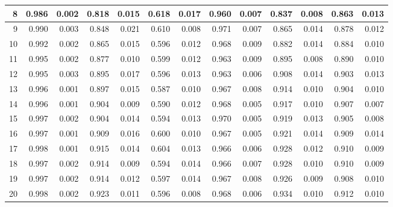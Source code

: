 \documentclass[
]{article}
\begin{document}
\begin{table}[H]
{\begin{tabular}[t]{r|r|r|r|r|r|r|r|r|r|r|r|r}
\hline
\hspace{1em}8 & 0.986 & 0.002 & 0.818 & 0.015 & 0.618 & 0.017 & 0.960 & 0.007 & 0.837 & 0.008 & 0.863 & 0.013\\
\hline
\hspace{1em}9 & 0.990 & 0.003 & 0.848 & 0.021 & 0.610 & 0.008 & 0.971 & 0.007 & 0.865 & 0.014 & 0.878 & 0.012\\
\hline
\hspace{1em}10 & 0.992 & 0.002 & 0.865 & 0.015 & 0.596 & 0.012 & 0.968 & 0.009 & 0.882 & 0.014 & 0.884 & 0.010\\
\hline
\hspace{1em}11 & 0.995 & 0.002 & 0.877 & 0.010 & 0.599 & 0.012 & 0.963 & 0.009 & 0.895 & 0.008 & 0.890 & 0.010\\
\hline
\hspace{1em}12 & 0.995 & 0.003 & 0.895 & 0.017 & 0.596 & 0.013 & 0.963 & 0.006 & 0.908 & 0.014 & 0.903 & 0.013\\
\hline
\hspace{1em}13 & 0.996 & 0.001 & 0.897 & 0.015 & 0.587 & 0.010 & 0.967 & 0.008 & 0.914 & 0.010 & 0.904 & 0.010\\
\hline
\hspace{1em}14 & 0.996 & 0.001 & 0.904 & 0.009 & 0.590 & 0.012 & 0.968 & 0.005 & 0.917 & 0.010 & 0.907 & 0.007\\
\hline
\hspace{1em}15 & 0.997 & 0.002 & 0.904 & 0.014 & 0.594 & 0.013 & 0.970 & 0.005 & 0.919 & 0.013 & 0.905 & 0.008\\
\hline
\hspace{1em}16 & 0.997 & 0.001 & 0.909 & 0.016 & 0.600 & 0.010 & 0.967 & 0.005 & 0.921 & 0.014 & 0.909 & 0.014\\
\hline
\hspace{1em}17 & 0.998 & 0.001 & 0.915 & 0.014 & 0.604 & 0.013 & 0.966 & 0.006 & 0.928 & 0.012 & 0.910 & 0.009\\
\hline
\hspace{1em}18 & 0.997 & 0.002 & 0.914 & 0.009 & 0.594 & 0.014 & 0.966 & 0.007 & 0.928 & 0.010 & 0.910 & 0.009\\
\hline
\hspace{1em}19 & 0.997 & 0.002 & 0.914 & 0.012 & 0.597 & 0.014 & 0.967 & 0.008 & 0.926 & 0.009 & 0.908 & 0.010\\
\hline
\hspace{1em}20 & 0.998 & 0.002 & 0.923 & 0.011 & 0.596 & 0.008 & 0.968 & 0.006 & 0.934 & 0.010 & 0.912 & 0.010\\
\hline

\end{tabular}}
\end{table}
\end{document}
